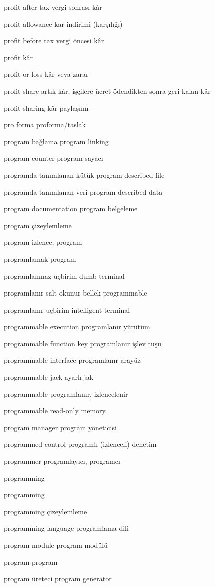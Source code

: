 \documentclass[12pt,fleqn]{article}\usepackage{../../common}
\begin{document}
profit after tax vergi sonrası kâr

profit allowance kar indirimi (karşılığı)

profit before tax vergi öncesi kâr

profit kâr

profit or loss kâr veya zarar

profit share artık kâr, işçilere ücret ödendikten sonra geri kalan kâr

profit sharing kâr paylaşımı

pro forma proforma/taslak

program bağlama program linking

program counter program sayacı

programda tanımlanan kütük program-described file

programda tanımlanan veri program-described data

program documentation program belgeleme

program çizeylemleme

program izlence, program

programlamak program

programlanmaz uçbirim dumb terminal

programlanır salt okunur bellek programmable

programlanır uçbirim intelligent terminal

programmable execution programlanır yürütüm

programmable function key programlanır işlev tuşu

programmable interface programlanır arayüz

programmable jack ayarlı jak

programmable programlanır, izlencelenir

programmable read-only memory

program manager program yöneticisi

programmed control programlı (izlenceli) denetim

programmer programlayıcı, programcı

programming

programming

programming çizeylemleme

programming language programlama dili

program module program modülü

program program

program üreteci program generator
\end{document}
